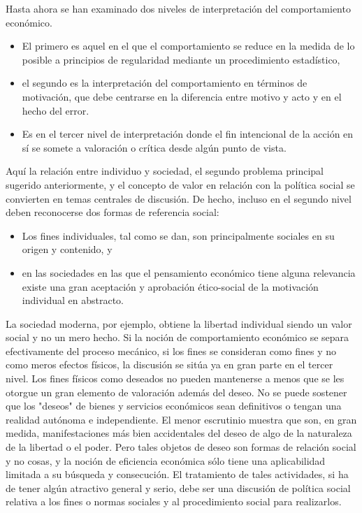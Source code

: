 Hasta ahora se han examinado dos niveles de interpretación del comportamiento económico. 
\begin{itemize}
    \item El primero es aquel en el que el comportamiento se reduce en la medida de lo posible a principios de regularidad mediante un procedimiento estadístico, 
    \item el segundo es la interpretación del comportamiento en términos de motivación, que debe centrarse en la diferencia entre motivo y acto y en el hecho del error. 
    \item Es en el tercer nivel de interpretación donde el fin intencional de la acción en sí se somete a valoración o crítica desde algún punto de vista.
\end{itemize}
Aquí la relación entre individuo y sociedad, el segundo problema principal sugerido anteriormente, y el concepto de valor en relación con la política social se convierten en temas centrales de discusión. De hecho, incluso en el segundo nivel deben reconocerse dos formas de referencia social:
\begin{itemize}
    \item Los fines individuales, tal como se dan, son principalmente sociales en su origen y contenido, y
    \item en las sociedades en las que el pensamiento económico tiene alguna relevancia existe una gran aceptación y aprobación ético-social de la motivación individual en abstracto.
\end{itemize}
La sociedad moderna, por ejemplo, obtiene la libertad individual siendo un valor social y no un mero hecho. Si la noción de comportamiento económico se separa efectivamente del proceso mecánico, si los fines se consideran como fines y no como meros efectos físicos, la discusión se sitúa ya en gran parte en el tercer nivel. Los fines físicos como deseados no pueden mantenerse a menos que se les otorgue un gran elemento de valoración además del deseo. No se puede sostener que los "deseos" de bienes y servicios económicos sean definitivos o tengan una realidad autónoma e independiente. El menor escrutinio muestra que son, en gran medida, manifestaciones más bien accidentales del deseo de algo de la naturaleza de la libertad o el poder. Pero tales objetos de deseo son formas de relación social y no cosas, y la noción de eficiencia económica sólo tiene una aplicabilidad limitada a su búsqueda y consecución. El tratamiento de tales actividades, si ha de tener algún atractivo general y serio, debe ser una discusión de política social relativa a los fines o normas sociales y al procedimiento social para realizarlos.\\

